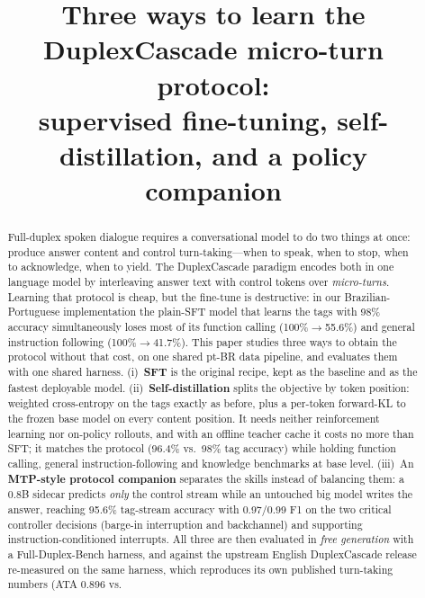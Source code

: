\documentclass[conference]{IEEEtran}
\begin{document}
\title{Three ways to learn the DuplexCascade micro-turn protocol:\\
supervised fine-tuning, self-distillation, and a policy companion}

\author{
\IEEEauthorblockA{}
}

\maketitle

\begin{abstract}
Full-duplex spoken dialogue requires a conversational model to do two things at
once: produce answer content and control turn-taking---when to speak, when to
stop, when to acknowledge, when to yield. The DuplexCascade paradigm encodes both
in one language model by interleaving answer text with control tokens over
\emph{micro-turns}. Learning that protocol is cheap, but the fine-tune is
destructive: in our Brazilian-Portuguese implementation the plain-SFT model that
learns the tags with 98\% accuracy simultaneously loses most of its function
calling (100\%$\rightarrow$55.6\%) and general instruction following
(100\%$\rightarrow$41.7\%). This paper studies three ways to obtain the protocol
without that cost, on one shared pt-BR data pipeline, and evaluates them with one
shared harness. (i)~\textbf{SFT} is the original recipe, kept as the baseline and
as the fastest deployable model. (ii)~\textbf{Self-distillation} splits the
objective by token position: weighted cross-entropy on the tags exactly as
before, plus a per-token forward-KL to the frozen base model on every content
position. It needs neither reinforcement learning nor on-policy rollouts, and
with an offline teacher cache it costs no more than SFT; it matches the protocol
(96.4\% vs.\ 98\% tag accuracy) while holding function calling, general
instruction-following and knowledge benchmarks at base level. (iii)~An
\textbf{MTP-style protocol companion} separates the skills instead of balancing
them: a 0.8B sidecar predicts \emph{only} the control stream while an untouched
big model writes the answer, reaching 95.6\% tag-stream accuracy with 0.97/0.99
F1 on the two critical controller decisions (barge-in interruption and
backchannel) and supporting instruction-conditioned interrupts. All three are
then evaluated in \emph{free generation} with a Full-Duplex-Bench harness, and
against the upstream English DuplexCascade release re-measured on the same
harness, which reproduces its own published turn-taking numbers (ATA 0.896 vs.\

\end{abstract}
\end{document}
